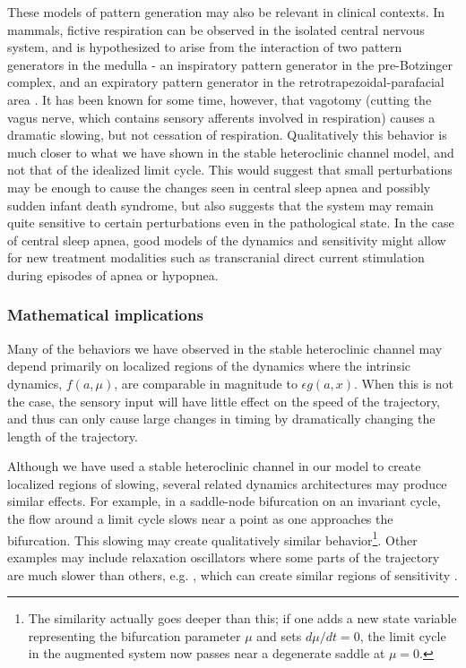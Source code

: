 These models of pattern generation may also be relevant in clinical contexts.
In mammals, fictive respiration can be observed in the isolated central nervous
system, and is hypothesized to arise from the interaction of two pattern
generators in the medulla - an inspiratory pattern generator in the
pre-Botzinger complex, and an expiratory pattern generator in the
retrotrapezoidal-parafacial area \citep{tomori_distinct_2010}.  It has been known
for some time, however, that vagotomy (cutting the vagus nerve, which contains
sensory afferents involved in respiration) causes a dramatic slowing, but not
cessation of respiration.  Qualitatively this behavior is much closer to what
we have shown in the stable heteroclinic channel model, and not that of the idealized limit cycle.
This would suggest that small perturbations may be enough to cause the changes
seen in central sleep apnea and possibly sudden infant death syndrome, but also
suggests that the system may remain quite sensitive to certain perturbations
even in the pathological state.  In the case of central sleep apnea, good
models of the dynamics and sensitivity might allow for new treatment modalities
such as transcranial direct current stimulation during episodes of apnea or
hypopnea.

\subsubsection{Mathematical implications}

Many of the behaviors we have observed in the stable heteroclinic channel may depend primarily on
localized regions of the dynamics where the intrinsic dynamics, $f(a, \mu)$,
are comparable in magnitude to $\epsilon g(a,x)$.  When this is not the case,
the sensory input will have little effect on the speed of the trajectory, and
thus can only cause large changes in timing by dramatically changing the length
of the trajectory.

Although we have used a stable heteroclinic channel in our model to create
localized regions of slowing, several related dynamics architectures may
produce similar effects.  For example, in a saddle-node bifurcation on an
invariant cycle, the flow around a limit cycle slows near a point as one
approaches the bifurcation.  This slowing may create qualitatively similar
behavior\footnote{The similarity actually goes deeper than this; if one adds a
new state variable representing the bifurcation parameter $\mu$ and sets
$d\mu/dt = 0$, the limit cycle in the augmented system now passes near a
degenerate saddle at $\mu = 0$.}.  Other examples may include relaxation
oscillators where some parts of the trajectory are much slower than others,
e.g. \citet{van_der_pol_relaxation-oscillations_1926}, which can create similar
regions of sensitivity \citep{bassler_definition_1986}.


